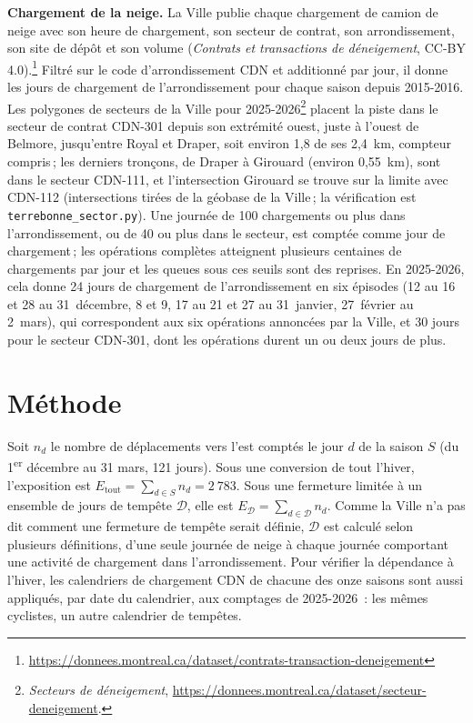 \documentclass[11pt,letterpaper]{article}
\begin{document}
\textbf{Chargement de la neige.} La Ville publie chaque chargement de
camion de neige avec son heure de chargement, son secteur de contrat, son
arrondissement, son site de dépôt et son volume (\emph{Contrats et
transactions de déneigement}, CC-BY
4.0).\footnote{\url{https://donnees.montreal.ca/dataset/contrats-transaction-deneigement}}
Filtré sur le code d'arrondissement CDN et additionné par jour, il donne
les jours de chargement de l'arrondissement pour chaque saison depuis
2015-2016. Les polygones de secteurs de la Ville pour
2025-2026\footnote{\emph{Secteurs de déneigement},
\url{https://donnees.montreal.ca/dataset/secteur-deneigement}.} placent la
piste dans le secteur de contrat CDN-301 depuis son extrémité ouest, juste
à l'ouest de Belmore, jusqu'entre Royal et Draper, soit environ 1,8 de ses
2,4~km, compteur compris\,; les derniers tronçons, de Draper à Girouard
(environ 0,55~km), sont dans le secteur CDN-111, et l'intersection
Girouard se trouve sur la limite avec CDN-112 (intersections tirées de la
géobase de la Ville\,; la vérification est \texttt{terrebonne\_sector.py}).
Une journée de 100 chargements ou plus dans l'arrondissement, ou
de 40 ou plus dans le secteur, est comptée comme jour de chargement\,; les
opérations complètes atteignent plusieurs centaines de chargements par
jour et les queues sous ces seuils sont des reprises. En 2025-2026, cela
donne 24 jours de chargement de l'arrondissement en six épisodes (12 au
16 et 28 au 31~décembre, 8 et 9, 17 au 21 et 27 au 31~janvier, 27~février
au 2~mars), qui correspondent aux six opérations annoncées par la Ville,
et 30 jours pour le secteur CDN-301, dont les opérations durent un ou deux
jours de plus.

\section{Méthode}

Soit $n_d$ le nombre de déplacements vers l'est comptés le jour $d$ de la
saison $S$ (du 1\textsuperscript{er} décembre au 31 mars, 121 jours). Sous
une conversion de tout l'hiver, l'exposition est $E_{\text{tout}} =
\sum_{d\in S} n_d = 2~783$. Sous une fermeture limitée à un ensemble de
jours de tempête $\mathcal{D}$, elle est $E_{\mathcal{D}} =
\sum_{d\in\mathcal{D}} n_d$. Comme la Ville n'a pas dit comment une
fermeture de tempête serait définie, $\mathcal{D}$ est calculé selon
plusieurs définitions, d'une seule journée de neige à chaque journée
comportant une activité de chargement dans l'arrondissement. Pour vérifier
la dépendance à l'hiver, les calendriers de chargement CDN de chacune des
onze saisons sont aussi appliqués, par date du calendrier, aux comptages
de 2025-2026~: les mêmes cyclistes, un autre calendrier de tempêtes.
\end{document}
